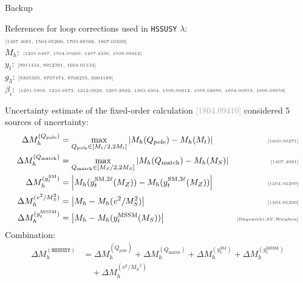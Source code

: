 \documentclass[hyperref={pdfpagelabels=false},ngerman]{beamer}
\newcommand{\MS}{\ensuremath{M_S}}
\newcommand{\mycite}[1]{\ensuremath{\text{\textcolor{darkgray}{\tiny [#1]}}}}
\newcommand{\bigcite}[1]{\textcolor{darkgray}{[#1]}}
\newcommand{\SM}{\ensuremath{\text{SM}}}
\newcommand{\MSSM}{\ensuremath{\text{MSSM}}}
\newcommand{\Loop}{\ensuremath{\ell}\xspace}
\newcommand{\Qpole}{\ensuremath{Q_\text{pole}}}
\newcommand{\Qmatch}{\ensuremath{Q_\text{match}}}
\newcommand{\DMhQpole}{\ensuremath{\Delta M_h^{(\Qpole)}}}
\newcommand{\DMhQmatch}{\ensuremath{\Delta M_h^{(\Qmatch)}}}
\newcommand{\DMhHSSUSY}{\ensuremath{\Delta M_h^{(\HSSUSY)}}}
\newcommand{\DMhHSSUSYytSM}{\ensuremath{\Delta M_h^{(y_t^\SM)}}}
\newcommand{\DMhHSSUSYytMSSM}{\ensuremath{\Delta M_h^{(y_t^\MSSM)}}}
\newcommand{\DMhEFT}{\ensuremath{\Delta M_h^{(v^2/\MS^2)}}}
\def\HSSUSY{\texttt{HSSUSY}}
\begin{document}
\begin{frame}[noframenumbering]
  \begin{center}
    \Huge Backup
  \end{center}
\end{frame}

\begin{frame}[noframenumbering]{References for loop corrections used in \HSSUSY}
  $\lambda$: \mycite{1407.4081, 1504.05200, 1703.08166, 1807.03509}\\
  $M_h$: \mycite{1205.6497, 1504.05200, 1407.4336, 1508.00912}\\
  $y_t$: \mycite{9911434, 9912391, 1604.01134}\\
  $g_3$: \mycite{9305305, 9707474, 9708255, 0004189}\\
  $\beta_i$: \mycite{1201.5868, 1210.6873, 1212.6829, 1205.2892, 1303.4364, 1508.00912, 1508.02680, 1604.00853, 1606.08659}
\end{frame}

\begin{frame}[noframenumbering]{Uncertainty estimate of the fixed-order calculation}
  \bigcite{1804.09410} considered 5 sources of uncertainty:
  \begin{align*}
    \DMhQpole &= \max_{\Qpole\in[M_t/2,2M_t]}\left|M_h(\Qpole) - M_h(M_t)\right| & \text{\mycite{1609.00371}} \\
    \DMhQmatch &= \max_{\Qmatch\in[\MS/2,2\MS]}\left|M_h(\Qmatch) - M_h(\MS)\right| & \text{\mycite{1407.4081}} \\
    \DMhHSSUSYytSM &= \left| M_h(y_t^{\SM,2\Loop}(M_Z)) - M_h(y_t^{\SM,3\Loop}(M_Z)) \right| & \text{\mycite{1504.05200}} \\
    \DMhEFT &= \left| M_h - M_h(v^2/\MS^2) \right| & \text{\mycite{1504.05200}} \\
    \DMhHSSUSYytMSSM &= \left| M_h - M_h(y_t^\MSSM(\MS)) \right| & \text{\mycite{Bagnaschi,AV,Weiglein}}
  \end{align*}
  Combination:
  \begin{align*}
    \DMhHSSUSY &= \DMhQpole + \DMhQmatch + \DMhHSSUSYytSM + \DMhHSSUSYytMSSM \\
    &\quad + \DMhEFT
  \end{align*}
\end{frame}
\end{document}
